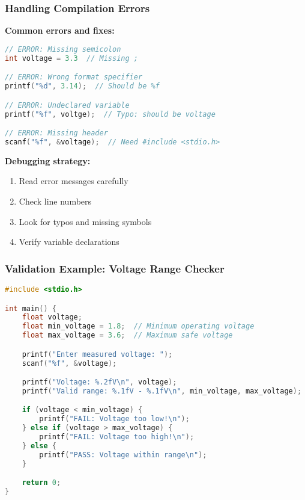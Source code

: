 \documentclass{beamer}
\begin{document}
\begin{frame}[fragile]
\frametitle{Handling Compilation Errors}
\textbf{Common errors and fixes:}

\begin{lstlisting}[language=C]
// ERROR: Missing semicolon
int voltage = 3.3  // Missing ;

// ERROR: Wrong format specifier
printf("%d", 3.14);  // Should be %f

// ERROR: Undeclared variable
printf("%f", voltge);  // Typo: should be voltage

// ERROR: Missing header
scanf("%f", &voltage);  // Need #include <stdio.h>
\end{lstlisting}

\textbf{Debugging strategy:}
\begin{enumerate}
    \item Read error messages carefully
    \item Check line numbers
    \item Look for typos and missing symbols
    \item Verify variable declarations
\end{enumerate}
\end{frame}

\begin{frame}[fragile]
\frametitle{Validation Example: Voltage Range Checker}
\begin{lstlisting}[language=C, basicstyle=\tiny]
#include <stdio.h>

int main() {
    float voltage;
    float min_voltage = 1.8;  // Minimum operating voltage
    float max_voltage = 3.6;  // Maximum safe voltage

    printf("Enter measured voltage: ");
    scanf("%f", &voltage);

    printf("Voltage: %.2fV\n", voltage);
    printf("Valid range: %.1fV - %.1fV\n", min_voltage, max_voltage);

    if (voltage < min_voltage) {
        printf("FAIL: Voltage too low!\n");
    } else if (voltage > max_voltage) {
        printf("FAIL: Voltage too high!\n");
    } else {
        printf("PASS: Voltage within range\n");
    }

    return 0;
}
\end{lstlisting}
\end{frame}
\end{document}
